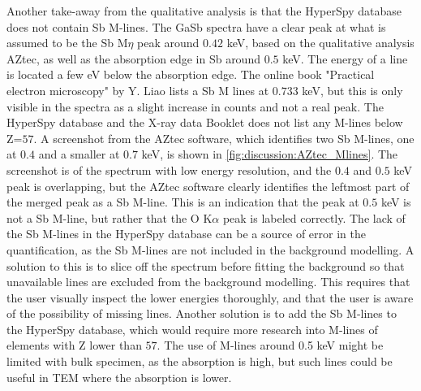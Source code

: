 Another take-away from the qualitative analysis is that the HyperSpy database does not contain Sb M-lines.
The GaSb spectra have a clear peak at what is assumed to be the Sb M$\eta$ peak around $0.42$ keV, based on the qualitative analysis AZtec, as well as the absorption edge in Sb around $0.5$ keV.
The energy of a line is located a few eV below the absorption edge.
The online book "Practical electron microscopy" by Y. Liao \cite{liao2006practical} lists a Sb M lines at $0.733$ keV, but this is only visible in the spectra as a slight increase in counts and not a real peak.
The HyperSpy database and the X-ray data Booklet \cite{thompson_x-ray_2004} does not list any M-lines below Z=$57$.
A screenshot from the AZtec software, which identifies two Sb M-lines, one at $0.4$ and a smaller at $0.7$ keV, is shown in \cref{fig:discussion:AZtec_Mlines}.
The screenshot is of the spectrum with low energy resolution, and the $0.4$ and $0.5$ keV peak is overlapping, but the AZtec software clearly identifies the leftmost part of the merged peak as a Sb M-line.
This is an indication that the peak at $0.5$ keV is not a Sb M-line, but rather that the O K$\alpha$ peak is labeled correctly.
The lack of the Sb M-lines in the HyperSpy database can be a source of error in the quantification, as the Sb M-lines are not included in the background modelling.
A solution to this is to slice off the spectrum before fitting the background so that unavailable lines are excluded from the background modelling.
This requires that the user visually inspect the lower energies thoroughly, and that the user is aware of the possibility of missing lines.
Another solution is to add the Sb M-lines to the HyperSpy database, which would require more research into M-lines of elements with Z lower than $57$.
The use of M-lines around 0.5 keV might be limited with bulk specimen, as the absorption is high, but such lines could be useful in TEM where the absorption is lower.

